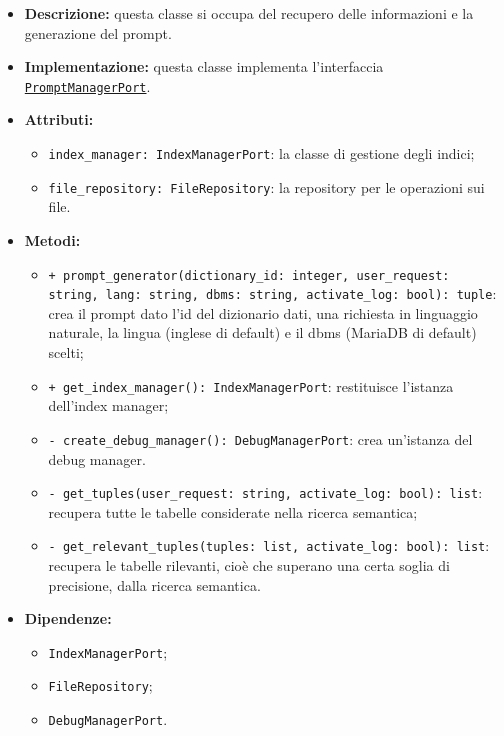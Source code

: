 \begin{itemize}
    \item \textbf{Descrizione:} questa classe si occupa del recupero delle informazioni e la generazione del prompt.
    \item \textbf{Implementazione:} questa classe implementa l'interfaccia \hyperref[PromptManagerPort]{\texttt{PromptManagerPort}}.
    \item \textbf{Attributi:}
    \begin{itemize}
        \item \texttt{index\_manager: IndexManagerPort}: la classe di gestione degli indici;
        \item \texttt{file\_repository: FileRepository}: la repository per le operazioni sui file.
    \end{itemize}
    \item \textbf{Metodi:}
    \begin{itemize}
        \item \texttt{+ prompt\_generator(dictionary\_id: integer, user\_request: string, lang: string, dbms: string, activate\_log: bool): tuple}: crea il prompt dato l'id del dizionario dati, una richiesta in linguaggio naturale, la lingua (inglese di default) e il dbms (MariaDB di default) scelti;
        \item \texttt{+ get\_index\_manager(): IndexManagerPort}: restituisce l'istanza dell'index manager;
        \item \texttt{- create\_debug\_manager(): DebugManagerPort}: crea un'istanza del debug manager.
        \item \texttt{- get\_tuples(user\_request: string, activate\_log: bool): list}: recupera tutte le tabelle considerate nella ricerca semantica;
        \item \texttt{- get\_relevant\_tuples(tuples: list, activate\_log: bool): list}: recupera le tabelle rilevanti, cioè che superano una certa soglia di precisione, dalla ricerca semantica.
    \end{itemize}
    \item \textbf{Dipendenze:}
    \begin{itemize}
        \item \texttt{IndexManagerPort};
        \item \texttt{FileRepository};
        \item \texttt{DebugManagerPort}.
    \end{itemize}
\end{itemize} 


